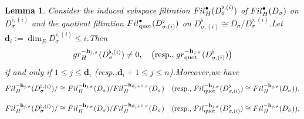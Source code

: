 \documentclass[10pt,a4paper]{amsart}
\newtheorem{lem}{Lemma}
\newcommand{\bd}{{\mathbf{d}}}
\newcommand{\bh}{{\mathbf{h}}}
\newcommand{\fil}{{\rm Fil}}
\newcommand{\gr}{{\rm gr}}
\begin{document}
\begin{lem}\label{hodgegapforquofil}
	Consider the induced subspace filtration $\fil_H^{\bullet}(D_{\sigma}^{\flat,(i)})$ of $\fil_H^{\bullet}(D_{\sigma})$ on $D_{\sigma}^{\flat,(i)}$ and the quotient filtration $\fil_{\mathrm{quot}}^{\bullet}(D^{\flat}_{\sigma,(i)})$ on $D^{\flat}_{\sigma,(i)}\cong D_{\sigma}/D_{\sigma}^{\flat,(i)}$.\;Let  $\bd_i:=\dim_ED_{\sigma}^{\flat,(i)}\leq i$.\;Then
	\begin{equation}
	\begin{aligned}
		\gr_H^{-\bh_{j,\sigma}}(D_{\sigma}^{\flat,(i)})\neq 0,\quad \big(\text{resp.,\;}\gr_{\mathrm{quot}}^{-\bh_{j,\sigma}}(D^{\flat}_{\sigma,(i)})\big)
	\end{aligned}
	\end{equation}
	if and only if $1\leq j\leq \bd_i$ (resp.,\;$\bd_i+1\leq j\leq n$).\;Moreover,\;we have
		\begin{equation}\label{comparefilwithflat}
		\begin{aligned}
			\fil_H^{-\bh_{j,\sigma}}(D_{\sigma}^{\flat,(i)})/\cong \fil_H^{-\bh_{j,\sigma}}(D_{\sigma})/\fil_H^{-\bh_{\bd_i+1,\sigma}}(D_{\sigma})\quad (\text{resp.,\;}\fil_{\mathrm{quot}}^{-\bh_{j,\sigma}}(D^{\flat}_{\sigma,(i)})\cong\fil_H^{-\bh_{j,\sigma}}(D_{\sigma})).
		\end{aligned}
	\end{equation}
\end{lem}

		\begin{equation}
		\begin{aligned}
			\fil_H^{-\bh_{j,\sigma}}(D_{\sigma}^{\flat,(i)})/\cong \fil_H^{-\bh_{j,\sigma}}(D_{\sigma})/\fil_H^{-\bh_{\bd_i+1,\sigma}}(D_{\sigma})\quad (\text{resp.,\;}\fil_{\mathrm{quot}}^{-\bh_{j,\sigma}}(D^{\flat}_{\sigma,(i)})\cong\fil_H^{-\bh_{j,\sigma}}(D_{\sigma})).
		\end{aligned}
	\end{equation}
\end{document}
